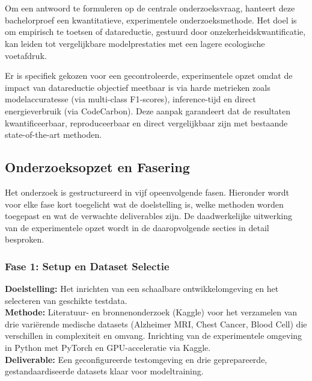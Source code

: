
\chapter{}%
\label{ch:methodologie}

Om een antwoord te formuleren op de centrale onderzoeksvraag, hanteert deze bachelorproef een kwantitatieve, experimentele onderzoeksmethode. Het doel is om empirisch te toetsen of datareductie, gestuurd door onzekerheidskwantificatie, kan leiden tot vergelijkbare modelprestaties met een lagere ecologische voetafdruk. 

Er is specifiek gekozen voor een gecontroleerde, experimentele opzet omdat de impact van datareductie objectief meetbaar is via harde metrieken zoals modelaccuratesse (via multi-class F1-scores), inference-tijd en direct energieverbruik (via CodeCarbon). Deze aanpak garandeert dat de resultaten kwantificeerbaar, reproduceerbaar en direct vergelijkbaar zijn met bestaande state-of-the-art methoden.

\section{Onderzoeksopzet en Fasering}
\label{sec:onderzoeksopzet}
Het onderzoek is gestructureerd in vijf opeenvolgende fasen. Hieronder wordt voor elke fase kort toegelicht wat de doelstelling is, welke methoden worden toegepast en wat de verwachte deliverables zijn. De daadwerkelijke uitwerking van de experimentele opzet wordt in de daaropvolgende secties in detail besproken.

\subsection{Fase 1: Setup en Dataset Selectie}
\textbf{Doelstelling:} Het inrichten van een schaalbare ontwikkelomgeving en het selecteren van geschikte testdata. \\
\textbf{Methode:} Literatuur- en bronnenonderzoek (Kaggle) voor het verzamelen van drie variërende medische datasets (Alzheimer MRI, Chest Cancer, Blood Cell) die verschillen in complexiteit en omvang. Inrichting van de experimentele omgeving in Python met PyTorch en GPU-acceleratie via Kaggle. \\
\textbf{Deliverable:} Een geconfigureerde testomgeving en drie geprepareerde, gestandaardiseerde datasets klaar voor modeltraining.

